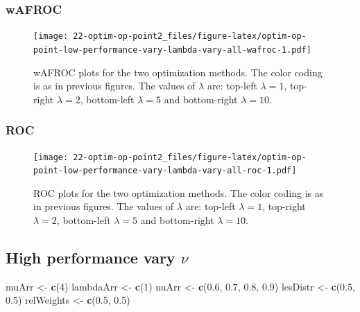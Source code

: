 \documentclass[
]{book}
\newenvironment{Shaded}{\begin{snugshade}}{\end{snugshade}}
\newcommand{\DecValTok}[1]{\textcolor[rgb]{0.00,0.00,0.81}{#1}}
\newcommand{\FloatTok}[1]{\textcolor[rgb]{0.00,0.00,0.81}{#1}}
\newcommand{\KeywordTok}[1]{\textcolor[rgb]{0.13,0.29,0.53}{\textbf{#1}}}
\newcommand{\NormalTok}[1]{#1}
\newcommand{\StringTok}[1]{\textcolor[rgb]{0.31,0.60,0.02}{#1}}
\begin{document}
\hypertarget{wafroc-8}{%
\subsubsection{wAFROC}\label{wafroc-8}}

\begin{figure}
\centering
\texttt{[image: 22-optim-op-point2\_files/figure-latex/optim-op-point-low-performance-vary-lambda-vary-all-wafroc-1.pdf]}
\caption{\label{fig:optim-op-point-low-performance-vary-lambda-vary-all-wafroc}wAFROC plots for the two optimization methods. The color coding is as in previous figures. The values of \(\lambda\) are: top-left \(\lambda = 1\), top-right \(\lambda = 2\), bottom-left \(\lambda = 5\) and bottom-right \(\lambda = 10\).}
\end{figure}

\hypertarget{roc-8}{%
\subsubsection{ROC}\label{roc-8}}

\begin{figure}
\centering
\texttt{[image: 22-optim-op-point2\_files/figure-latex/optim-op-point-low-performance-vary-lambda-vary-all-roc-1.pdf]}
\caption{\label{fig:optim-op-point-low-performance-vary-lambda-vary-all-roc}ROC plots for the two optimization methods. The color coding is as in previous figures. The values of \(\lambda\) are: top-left \(\lambda = 1\), top-right \(\lambda = 2\), bottom-left \(\lambda = 5\) and bottom-right \(\lambda = 10\).}
\end{figure}

\hypertarget{optim-op-point-high-performance-vary-nu}{%
\subsection{\texorpdfstring{High performance vary \(\nu\)}{High performance vary \textbackslash nu}}\label{optim-op-point-high-performance-vary-nu}}

\begin{Shaded}
\begin{Highlighting}[]
\NormalTok{muArr <-}\StringTok{ }\KeywordTok{c}\NormalTok{(}\DecValTok{4}\NormalTok{)}
\NormalTok{lambdaArr <-}\StringTok{ }\KeywordTok{c}\NormalTok{(}\DecValTok{1}\NormalTok{)}
\NormalTok{nuArr <-}\StringTok{ }\KeywordTok{c}\NormalTok{(}\FloatTok{0.6}\NormalTok{, }\FloatTok{0.7}\NormalTok{, }\FloatTok{0.8}\NormalTok{, }\FloatTok{0.9}\NormalTok{)}
\NormalTok{lesDistr <-}\StringTok{ }\KeywordTok{c}\NormalTok{(}\FloatTok{0.5}\NormalTok{, }\FloatTok{0.5}\NormalTok{)}
\NormalTok{relWeights <-}\StringTok{ }\KeywordTok{c}\NormalTok{(}\FloatTok{0.5}\NormalTok{, }\FloatTok{0.5}\NormalTok{)}
\end{Highlighting}
\end{Shaded}
\end{document}
